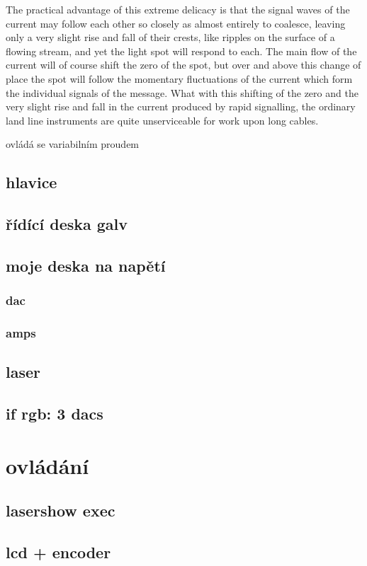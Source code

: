 \documentclass{template/socthesis}
\begin{document}
The practical advantage of this extreme delicacy is that the signal waves of the current may follow each other so closely as almost entirely to coalesce, leaving only a very slight rise and fall of their crests, like ripples on the surface of a flowing stream, and yet the light spot will respond to each. The main flow of the current will of course shift the zero of the spot, but over and above this change of place the spot will follow the momentary fluctuations of the current which form the individual signals of the message. What with this shifting of the zero and the very slight rise and fall in the current produced by rapid signalling, the ordinary land line instruments are quite unserviceable for work upon long cables.

ovládá se variabilním proudem

\section{hlavice}
\section{řídící deska galv}
\section{moje deska na napětí}
\subsection{dac}
\subsection{amps}

\section{laser}
\section{if rgb: 3 dacs}


\chapter{ovládání}
\section{lasershow exec}
\section{lcd + encoder}
\end{document}
